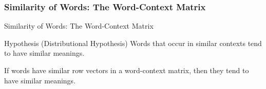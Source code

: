 \subsubsection{Similarity of Words: The Word-Context Matrix}
\begin{frame}{Similarity of Words: The Word-Context Matrix}
\begin{block}{Hypothesis (Distributional Hypothesis)}
Words that occur in similar contexts tend to have similar meanings\cite{Harris1954vsmh2,Firth1957vsmh2}.
\end{block}
If words have similar row vectors in a word-context matrix, then they tend to have similar meanings.\\
\end{frame}

